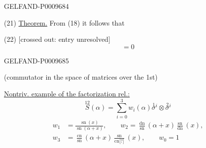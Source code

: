 \begin{GelfandAdjacentEvidence}{GELFAND-P000968}{4}


(21) \underline{Theorem.} From (18) it follows that

(22) [crossed out: entry unresolved]
\begin{equation*}
 [\operatorname{Sp}_3\overset{13}{S},\ \operatorname{Sp}_3\overset{13}{S}']=0
\end{equation*}
\end{GelfandAdjacentEvidence}
\begin{GelfandAdjacentEvidence}{GELFAND-P000968}{5}


(commutator in the space of matrices over the 1st)

\underline{Nontriv. example of the factorization rel.:}
\begin{equation*}
 \overset{12}{S}(\alpha)=\sum_{i=0}^{3}
 w_i(\alpha)\overset{1}{\sigma}{}^{i}\otimes\overset{2}{\sigma}{}^{i}\tag{23}
\end{equation*}
\begin{equation*}
\begin{aligned}
 w_1&=\frac{\operatorname{sn}(x)}{\operatorname{sn}(\alpha+x)},\qquad
 w_2=\frac{\operatorname{dn}}{\operatorname{sn}}(\alpha+x)
     \frac{\operatorname{sn}}{\operatorname{dn}}(x),\\
 w_3&=\frac{\operatorname{cn}}{\operatorname{sn}}(\alpha+x)
     \frac{\operatorname{sn}}{\operatorname{cn}\text{[?]}}(x),\qquad
 w_0=1
\end{aligned}\tag{24}
\end{equation*}
\end{GelfandAdjacentEvidence}
